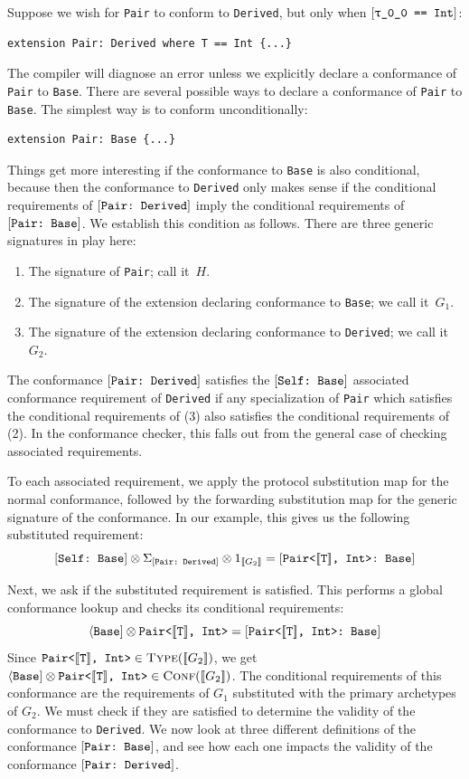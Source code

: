 \documentclass[../generics]{subfiles}
\begin{document}
Suppose we wish for \texttt{Pair} to conform to \texttt{Derived}, but only when $\SameReq{\rT}{Int}$:
\begin{Verbatim}
extension Pair: Derived where T == Int {...}
\end{Verbatim}
The compiler will diagnose an error unless we explicitly declare a conformance of \texttt{Pair} to \texttt{Base}. There are several possible ways to declare a conformance of \texttt{Pair} to \texttt{Base}. The simplest way is to conform unconditionally:
\begin{Verbatim}
extension Pair: Base {...}
\end{Verbatim}
Things get more interesting if the conformance to \texttt{Base} is also conditional, because then the conformance to \texttt{Derived} only makes sense if the conditional requirements of $[\texttt{Pair:~Derived}]$ imply the conditional requirements of $[\texttt{Pair:~Base}]$. We establish this condition as follows. There are three generic signatures in play here:
\begin{enumerate}
\item The signature of \texttt{Pair}; call it~$H$.
\item The signature of the extension declaring conformance to \texttt{Base}; we call it~$G_1$.
\item The signature of the extension declaring conformance to \texttt{Derived}; we call it~$G_2$.
\end{enumerate}
The conformance $[\texttt{Pair:~Derived}]$ satisfies the $[\texttt{Self:~Base}]$ associated conformance requirement of \texttt{Derived} if any specialization of \verb|Pair| which satisfies the conditional requirements of (3) also satisfies the conditional requirements of (2). In the conformance checker, this falls out from the general case of checking associated requirements.

To each associated requirement, we apply the protocol substitution map for the normal conformance, followed by the forwarding substitution map for the generic signature of the conformance. In our example, this gives us the following substituted requirement:
\[
[\texttt{Self:~Base}]\otimes\Sigma_{[\texttt{Pair:~Derived}]}\otimes 1_{[\![G_2]\!]} = [\texttt{Pair<$[\![\texttt{T}]\!]$, Int>:~Base}]
\]

Next, we ask  if the substituted requirement is satisfied. This performs a global conformance lookup and checks its conditional requirements:
\[
\langle\texttt{Base}]\otimes \texttt{Pair<$[\![\texttt{T}]\!]$, Int>} = [\texttt{\texttt{Pair<$[\![\texttt{T}]\!]$, Int>}:~Base}]
\]
Since $\texttt{Pair<$[\![\texttt{T}]\!]$, Int>}\in\textsc{Type}({[\![G_2]\!]})$, we get $\langle\texttt{Base}]\otimes \texttt{Pair<$[\![\texttt{T}]\!]$, Int>}\in\textsc{Conf}({[\![G_2]\!]})$. The conditional requirements of this conformance are the requirements of $G_1$ substituted with the primary archetypes of $G_2$. We must check if they are satisfied to determine the validity of the conformance to \texttt{Derived}. We now look at three different definitions of the conformance $[\texttt{Pair:~Base}]$, and see how each one impacts the validity of the conformance $[\texttt{Pair:~Derived}]$.
\end{document}
